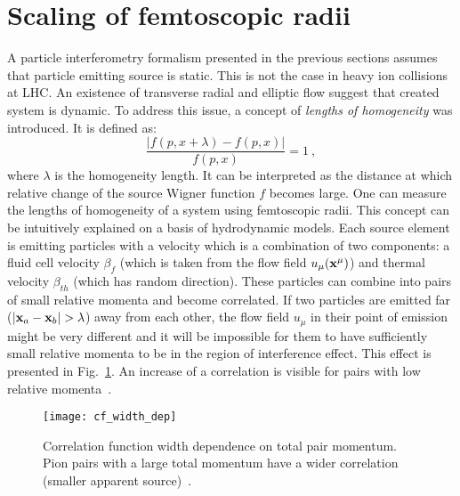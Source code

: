   \section{Scaling of femtoscopic radii}
  \label{ch:pi-scaling}
    A particle interferometry formalism presented in the previous sections assumes that particle emitting source is static.
    This is not the case in heavy ion collisions at LHC.
    An existence of transverse radial and elliptic flow suggest that created system is dynamic.
    To address this issue, a concept of \textit{lengths of homogeneity} was introduced.
    It is defined as:
    \begin{equation}
      \frac{|f(p,x + \lambda) - f(p,x)|}{f(p,x)} = 1~,
    \end{equation}
    where $\lambda$ is the homogeneity length.
    It can be interpreted as the distance at which relative change of the source Wigner function $f$ becomes large.
    One can measure the lengths of homogeneity of a system using femtoscopic radii.
    This concept can be intuitively explained on a basis of hydrodynamic models.
    Each source element is emitting particles with a velocity which is a combination of two components: a fluid cell velocity $\beta_f$ (which is taken from the flow field $u_{\mu}(\mathbf{x^{\mu}})$) and thermal velocity $\beta_{th}$ (which has random direction).
    These particles can combine into pairs of small relative momenta and become correlated.
    If two particles are emitted far ($|\mathbf{x}_a - \mathbf{x}_b| > \lambda$) away from each other, the flow field $u_\mu$ in their point of emission might be very different and it will be impossible for them to have sufficiently small relative momenta to be in the region of interference effect.
    This effect is presented in Fig.~\ref{fig:cf_width}.
    An increase of a correlation is visible for pairs with low relative momenta~\cite{drkisiel}.
    \begin{figure}[h]
      \centering
      \texttt{[image: cf\_width\_dep]}
      \caption{Correlation function width dependence on total pair momentum. Pion pairs with a large total momentum have a wider correlation (smaller apparent source)~\cite{pratt_pion}.}
      \label{fig:cf_width}
    \end{figure}
